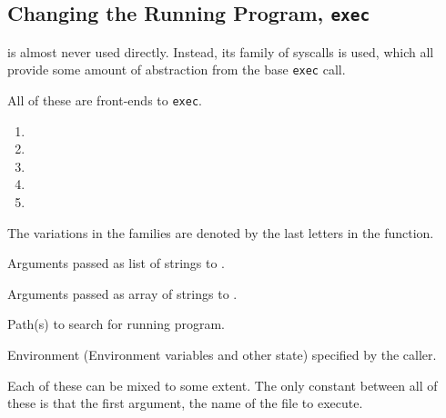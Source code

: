 \subsection{Changing the Running Program, \texttt{exec}}\label{subsec:Change_Running_Program-exec}
 is almost never used directly.
Instead, its family of syscalls is used, which all provide some amount of abstraction from the base \texttt{exec} call.

All of these are front-ends to \texttt{exec}.
\begin{enumerate}[noitemsep]
\item {}
\item {}
\item {}
\item {}
\item {}
\end{enumerate}

The variations in the families are denoted by the last letters in the function.
\begin{description}[noitemsep]
\item[\texttt{l}:] Arguments passed as list of strings to .
\item[\texttt{v}:] Arguments passed as array of strings to .
\item[\texttt{p}:] Path(s) to search for running program.
\item[\texttt{e}:] Environment (Environment variables and other state) specified by the caller.
\end{description}

Each of these can be mixed to some extent.
The only constant between all of these is that the first argument, the name of the file to execute.



